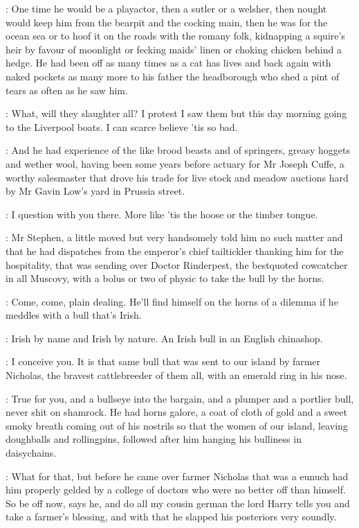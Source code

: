 \documentclass[12pt]{article}
\begin{document}
: One time he would be a playactor, then a sutler or a welsher,
then nought would keep him from the bearpit and the cocking main, then he
was for the ocean sea or to hoof it on the roads with the romany folk,
kidnapping a squire's heir by favour of moonlight or fecking maids' linen
or choking chicken behind a hedge. He had been off as many times as a cat
has lives and back again with naked pockets as many more to his father
the headborough who shed a pint of tears as often as he saw him.

\Bl: What, will they slaughter all? I protest I saw them but this day
morning going to the Liverpool boats. I can scarce believe 'tis so bad.

: And he had experience of the like brood beasts and of springers,
greasy hoggets and wether wool, having been some years before actuary for
Mr Joseph Cuffe, a worthy salesmaster that drove his trade for live stock
and meadow auctions hard by Mr Gavin Low's yard in Prussia street.

\Bl: I question with you there.
More like 'tis the hoose or the timber tongue.

: Mr Stephen, a little moved but very handsomely told him no such
matter and that he had dispatches from the emperor's chief tailtickler
thanking him for the hospitality, that was sending over Doctor
Rinderpest, the bestquoted cowcatcher in all Muscovy, with a bolus or two
of physic to take the bull by the horns.

\Ly: Come, come, plain dealing.
He'll find himself on the horns of a dilemma if he meddles
with a bull that's Irish.

\SD: Irish by name and Irish by nature.
An Irish bull in an English chinashop.

\Dx: I conceive you. It is that same bull that was sent to our island by
farmer Nicholas, the bravest cattlebreeder of them all, with an emerald
ring in his nose.

\Ly: True for you, and a bullseye into the bargain, and a
plumper and a portlier bull, never shit on shamrock. He had
horns galore, a coat of cloth of gold and a sweet smoky breath coming out
of his nostrils so that the women of our island, leaving doughballs and
rollingpins, followed after him hanging his bulliness in daisychains.

\Dx: What for that, but before he came over farmer Nicholas
that was a eunuch had him properly gelded by a college of doctors who
were no better off than himself. So be off now, says he, and do all my
cousin german the lord Harry tells you and take a farmer's blessing, and
with that he slapped his posteriors very soundly.
\end{document}
